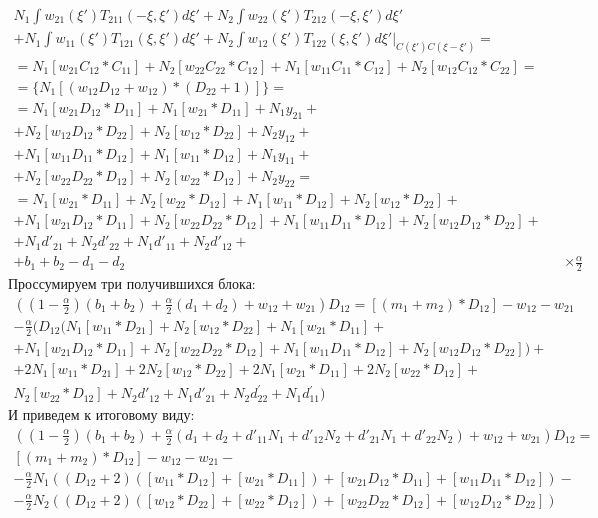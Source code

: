 \begin{align*}
N_{1}\int w_{21}(\xi')T_{211}(-\xi,\xi')d\xi'+N_{2}\int w_{22}(\xi')T_{212}(-\xi,\xi')d\xi'		\\
+N_{1}\int w_{11}(\xi')T_{121}(\xi,\xi')d\xi'+N_{2}\int w_{12}(\xi')T_{122}(\xi,\xi')d\xi'|_{C(\xi')C(\xi-\xi')}	=	\\
=N_{1}[w_{21}C_{12}*C_{11}]+N_{2}[w_{22}C_{22}*C_{12}]+N_{1}[w_{11}C_{11}*C_{12}]+N_{2}[w_{12}C_{12}*C_{22}]	=	\\
=\{N_{1}[(w_{12}D_{12}+w_{12})*(D_{22}+1)]\}	=	\\
=N_{1}[w_{21}D_{12}*D_{11}]+N_{1}[w_{21}*D_{11}]+N_{1}y_{21}	+	\\
+N_{2}[w_{12}D_{12}*D_{22}]+N_{2}[w_{12}*D_{22}]+N_{2}y_{12}	+	\\
+N_{1}[w_{11}D_{11}*D_{12}]+N_{1}[w_{11}*D_{12}]+N_{1}y_{11}	+	\\
+N_{2}[w_{22}D_{22}*D_{12}]+N_{2}[w_{22}*D_{12}]+N_{2}y_{22}	=	\\
=N_{1}[w_{21}*D_{11}]+N_{2}[w_{22}*D_{12}]+N_{1}[w_{11}*D_{12}]+N_{2}[w_{12}*D_{22}]	+	\\
+N_{1}[w_{21}D_{12}*D_{11}]+N_{2}[w_{22}D_{22}*D_{12}]+N_{1}[w_{11}D_{11}*D_{12}]+N_{2}[w_{12}D_{12}*D_{22}]	+	\\
+N_{1}d'_{21}+N_{2}d'_{22}+N_{1}d'_{11}+N_{2}d'_{12}	+	\\
+b_{1}+b_{2}-d_{1}-d_{2}	&&	\times\frac{\alpha}{2}
\end{align*}
Проссумируем три получившихся блока:
\begin{align*}
((1-\frac{\alpha}{2})(b_{1}+b_{2})+\frac{\alpha}{2}(d_{1}+d_{2})+w_{12}+w_{21})D_{12}=[(m_{1}+m_{2})*D_{12}]-w_{12}-w_{21}		\\
-\frac{\alpha}{2}(D_{12}(N_{1}[w_{11}*D_{21}]+N_{2}[w_{12}*D_{22}]+N_{1}[w_{21}*D_{11}]+		\\
+N_{1}[w_{21}D_{12}*D_{11}]+N_{2}[w_{22}D_{22}*D_{12}]+N_{1}[w_{11}D_{11}*D_{12}]+N_{2}[w_{12}D_{12}*D_{22}]) + \\
+2N_{1}[w_{11}*D_{21}]+2N_{2}[w_{12}*D_{22}]+2N_{1}[w_{21}*D_{11}]+2N_{2}[w_{22}*D_{12}]+	\\			
N_{2}[w_{22}*D_{12}]+N_{2}d'_{12}+N_{1}d'_{21}+N_{2}d_{22}^{'}+N_{1}d{}_{11}^{'})
\end{align*}
И приведем к итоговому виду:
\begin{align*}
((1-\frac{\alpha}{2})(b_{1}+b_{2})+\frac{\alpha}{2}(d_{1}+d_{2}+d'_{11}N_{1}+d'_{12}N_{2}+d'_{21}N_{1}+d'_{22}N_{2})+w_{12}+w_{21})D_{12}=	\\
[(m_{1}+m_{2})*D_{12}]-w_{12}-w_{21}-\\
-\frac{\alpha}{2}N_{1}((D_{12}+2)([w_{11}*D_{12}]+[w_{21}*D_{11}])+[w_{21}D_{12}*D_{11}]+[w_{11}D_{11}*D_{12}])-\\		
-\frac{\alpha}{2}N_{2}((D_{12}+2)([w_{12}*D_{22}]+[w_{22}*D_{12}])+[w_{22}D_{22}*D_{12}]+[w_{12}D_{12}*D_{22}])		
\end{align*}

